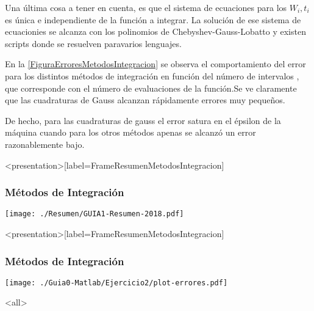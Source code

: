 Una última cosa a tener en cuenta, es que el sistema de ecuaciones
para los $W_i, t_i$ es única e independiente de la función a 
integrar. La solución de ese sistema de ecuacionies se alcanza 
con los polinomios de Chebyshev-Gauss-Lobatto y existen 
scripts donde se resuelven paravarios lenguajes.

En la \autoref{FiguraErroresMetodosIntegracion} se observa el comportamiento del
error para los distintos métodos de integración en función del 
número de intervalos , que corresponde con el número de evaluaciones 
de la función.Se ve claramente que las cuadraturas de Gauss 
alcanzan rápidamente errores muy pequeños. 

De hecho, para las cuadraturas de gauss el error satura en el 
épsilon de la máquina cuando para los otros métodos apenas se alcanzó
un error razonablemente bajo. 

\mode*


\begin{frame}<presentation>[label=FrameResumenMetodosIntegracion]
  \frametitle{Métodos de Integración}
  \center
  \texttt{[image: ./Resumen/GUIA1-Resumen-2018.pdf]}
\end{frame}

\begin{frame}<presentation>[label=FrameResumenMetodosIntegracion]
  \frametitle{Métodos de Integración}
  \center
  \texttt{[image: ./Guia0-Matlab/Ejercicio2/plot-errores.pdf]}
\end{frame}

\mode<all>
